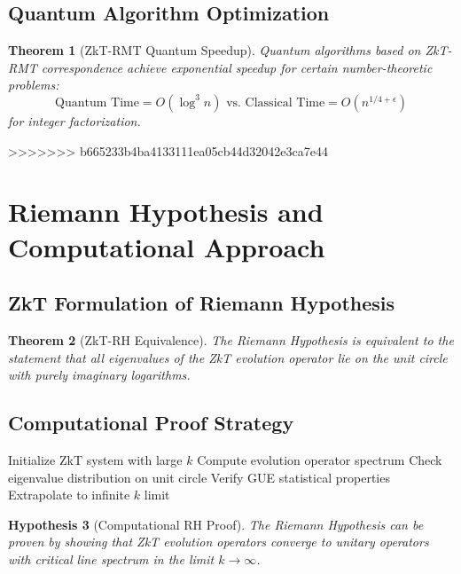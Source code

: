 \documentclass[12pt]{article}
\theoremstyle{plain}
\newtheorem{theorem}{Theorem}[section]
\newtheorem{hypothesis}[theorem]{Hypothesis}
\theoremstyle{definition}
\begin{document}
\subsection{Quantum Algorithm Optimization}

\begin{theorem}[ZkT-RMT Quantum Speedup]
Quantum algorithms based on ZkT-RMT correspondence achieve exponential speedup for certain number-theoretic problems:
\begin{equation}
\text{Quantum Time} = O(\log^3 n) \text{ vs. Classical Time} = O(n^{1/4+\epsilon})
\end{equation}
for integer factorization.
\end{theorem}
>>>>>>> b665233b4ba4133111ea05cb44d32042e3ca7e44

\section{Riemann Hypothesis and Computational Approach}

\subsection{ZkT Formulation of Riemann Hypothesis}

\begin{theorem}[ZkT-RH Equivalence]
The Riemann Hypothesis is equivalent to the statement that all eigenvalues of the ZkT evolution operator lie on the unit circle with purely imaginary logarithms.
\end{theorem}

\subsection{Computational Proof Strategy}

\begin{algorithm}
\caption{ZkT-based RH Verification}
\begin{algorithmic}
\STATE Initialize ZkT system with large $k$
\STATE Compute evolution operator spectrum
\STATE Check eigenvalue distribution on unit circle
\STATE Verify GUE statistical properties
\STATE Extrapolate to infinite $k$ limit
\end{algorithmic}
\end{algorithm}

\begin{hypothesis}[Computational RH Proof]
The Riemann Hypothesis can be proven by showing that ZkT evolution operators converge to unitary operators with critical line spectrum in the limit $k \to \infty$.
\end{hypothesis}
\end{document}

